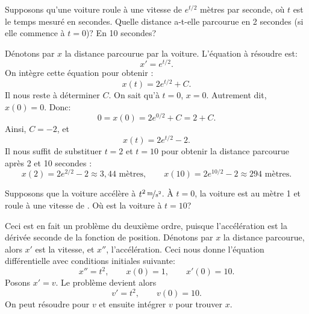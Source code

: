\begin{example}
	Supposons qu'une voiture roule à une vitesse de $e^{t/2}$ mètres par seconde,
	où $t$ est le temps mesuré en secondes.
	Quelle distance a-t-elle parcourue en 2 secondes (si elle commence à $t=0$)?
	En 10 secondes?

	Dénotons par $x$ la distance parcourue par la voiture.
	L'équation à résoudre est:
	\begin{equation*}
		x' = e^{t/2} .
	\end{equation*}
	On intègre cette équation pour obtenir :
	\begin{equation*}
		x(t) = 2 e^{t/2} + C .
	\end{equation*}
	Il nous reste à déterminer $C$.  On sait qu'à $t=0$,
	$x=0$.  Autrement dit, $x(0) = 0$.  Donc:
	\begin{equation*}
		0 = x(0) = 2e^{0/2} + C = 2 + C .
	\end{equation*}
	Ainsi, $C = -2$, et
	\begin{equation*}
		x(t) = 2 e^{t/2} - 2 .
	\end{equation*}
	Il nous suffit de substituer $t=2$ et $t=10$ pour obtenir la distance parcourue après 2 et 10 secondes :
	\begin{equation*}
		x(2) = 2e^{2/2} - 2 \approx 3{,}44 \text{ mètres} ,
		\qquad
		x(10) = 2e^{10/2} - 2 \approx 294 \text{ mètres} .
	\end{equation*}
\end{example}

\begin{example}
	Supposons que la voiture accélère à $\unitfrac[t^2]{m}{s^2}$.
	À $t=0$, la voiture est au mètre 1 et roule à une vitesse de .
	Où est la voiture à $t=10$?

	Ceci est en fait un problème du deuxième ordre, puisque l'accélération est la dérivée seconde de la fonction de position.
	Dénotons par $x$ la distance parcourue, alors $x'$ est la vitesse, et $x''$, l'accélération.
	Ceci nous donne l'équation différentielle avec conditions initiales suivante:
	\begin{equation*}
		x'' = t^2 , \qquad x(0) = 1 , \qquad x'(0) = 10 .
	\end{equation*}
	Posons $x' = v$.  Le problème devient alors
	\begin{equation*}
		v' = t^2, \qquad v(0) = 10 .
	\end{equation*}
	On peut résoudre pour $v$ et ensuite intégrer $v$ pour trouver $x$.
\end{example}


